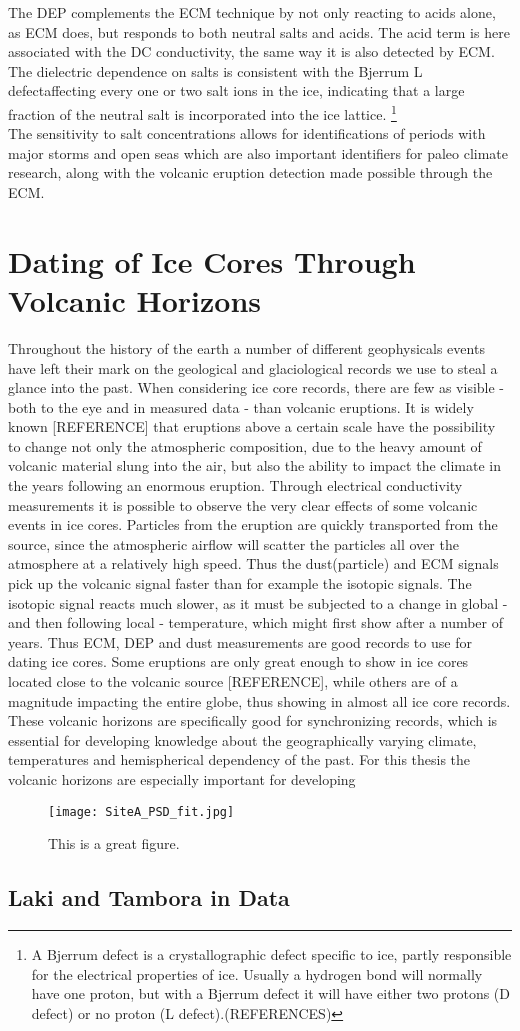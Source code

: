 \documentclass[../../CompleteThesis/Complete_1stDraft.tex]{subfiles}
\begin{document}
The DEP complements the ECM technique by not only reacting to acids alone, as ECM does, but responds to both neutral salts and acids.
The acid term is here associated with the DC conductivity, the same way it is also detected by ECM. The dielectric dependence on salts is consistent with the Bjerrum L defect\footnotemark affecting every one or two salt ions in the ice, indicating that a large fraction of the neutral salt is incorporated into the ice lattice.
\footnote[3]{A Bjerrum defect is a crystallographic defect specific to ice, partly responsible for the electrical properties of ice. Usually a hydrogen bond will normally have one proton, but with a Bjerrum defect it will have either two protons (D defect) or no proton (L defect).(REFERENCES)}\\
The sensitivity to salt concentrations allows for identifications of periods with major storms and open seas which are also important identifiers for paleo climate research, along with the volcanic eruption detection made possible through the ECM.



\section[Volcanic Horizons][Volcanic Horizons]{Dating of Ice Cores Through Volcanic Horizons}
Throughout the history of the earth a number of different geophysicals events have left their mark on the geological and glaciological records we use to steal a glance into the past. When considering ice core records, there are few as visible - both to the eye and in measured data - than volcanic eruptions. It is widely known [REFERENCE] that eruptions above a certain scale have the possibility to change not only the atmospheric composition, due to the heavy amount of volcanic material slung into the air, but also the ability to impact the climate in the years following an enormous eruption. 
Through electrical conductivity measurements it is possible to observe the very clear effects of some volcanic events in ice cores. Particles from the eruption are quickly transported from the source, since the atmospheric airflow will scatter the particles all over the atmosphere at a relatively high speed. Thus the dust(particle) and ECM signals pick up the volcanic signal faster than for example the isotopic signals. The isotopic signal reacts much slower, as it must be subjected to a change in global - and then following local - temperature, which might first show after a number of years. Thus ECM, DEP and dust measurements are good records to use for dating ice cores. Some eruptions are only great enough to show in ice cores located close to the volcanic source [REFERENCE], while others are of a magnitude impacting the entire globe, thus showing in almost all ice core records. These volcanic horizons are specifically good for synchronizing records, which is essential for developing knowledge about the geographically varying climate, temperatures and hemispherical dependency of the past. 
For this thesis the volcanic horizons are especially important for developing

\begin{figure}
	\centering
	\texttt{[image: SiteA\_PSD\_fit.jpg]}
	\caption{This is a great figure.}
	\label{Fig:d18O_ECM_Example}
\end{figure}
\subsection[Laki and Tambora][Laki and Tambora]{Laki and Tambora in Data}
\end{document}
